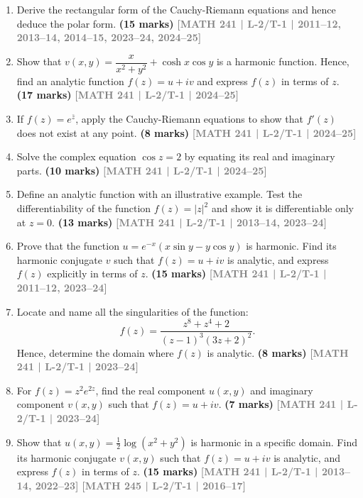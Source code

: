 \documentclass[12pt,a3paper]{article}
\newcommand{\yr}[1]{\hfill\textcolor{gray}{\small\textbf{[#1]}}}
\newcommand{\mk}[1]{\textcolor{orange!70!black}{\small\textbf{(#1 marks)}}}
\begin{document}
\begin{enumerate}

\item Derive the rectangular form of the Cauchy-Riemann equations and hence deduce the polar form.
\mk{15} \yr{MATH 241 | L-2/T-1 | 2011--12, 2013--14, 2014--15, 2023--24, 2024--25}



\item Show that $v(x,y)=\dfrac{x}{x^{2}+y^{2}}+\cosh x\cos y$ is a harmonic function. Hence, find an analytic function $f(z)=u+iv$ and express $f(z)$ in terms of $z$.
\mk{17} \yr{MATH 241 | L-2/T-1 | 2024--25}


\item If $f(z)=e^{\bar{z}}$, apply the Cauchy-Riemann equations to show that $f'(z)$ does not exist at any point.
\mk{8} \yr{MATH 241 | L-2/T-1 | 2024--25}


\item Solve the complex equation $\cos z=2$ by equating its real and imaginary parts.
\mk{10} \yr{MATH 241 | L-2/T-1 | 2024--25}



\item Define an analytic function with an illustrative example. Test the differentiability of the function $f(z)=|z|^{2}$ and show it is differentiable only at $z=0$.
\mk{13} \yr{MATH 241 | L-2/T-1 | 2013--14, 2023--24}



\item Prove that the function $u=e^{-x}(x\sin y - y\cos y)$ is harmonic. Find its harmonic conjugate $v$ such that $f(z)=u+iv$ is analytic, and express $f(z)$ explicitly in terms of $z$.
\mk{15} \yr{MATH 241 | L-2/T-1 | 2011--12, 2023--24}


\item Locate and name all the singularities of the function:
\[
f(z)=\frac{z^{8}+z^{4}+2}{(z-1)^{3}(3z+2)^{2}}.
\]
Hence, determine the domain where $f(z)$ is analytic.
\mk{8} \yr{MATH 241 | L-2/T-1 | 2023--24}




\item For $f(z)=z^{2}e^{2z}$, find the real component $u(x,y)$ and imaginary component $v(x,y)$ such that $f(z)=u+iv$.
\mk{7} \yr{MATH 241 | L-2/T-1 | 2023--24}


\item Show that $u(x,y)=\tfrac{1}{2}\log(x^{2}+y^{2})$ is harmonic in a specific domain. Find its harmonic conjugate $v(x,y)$ such that $f(z)=u+iv$ is analytic, and express $f(z)$ in terms of $z$.
\mk{15} \yr{MATH 241 | L-2/T-1 | 2013--14, 2022--23} \yr{MATH 245 | L-2/T-1 | 2016--17}


\end{enumerate}
\end{document}
